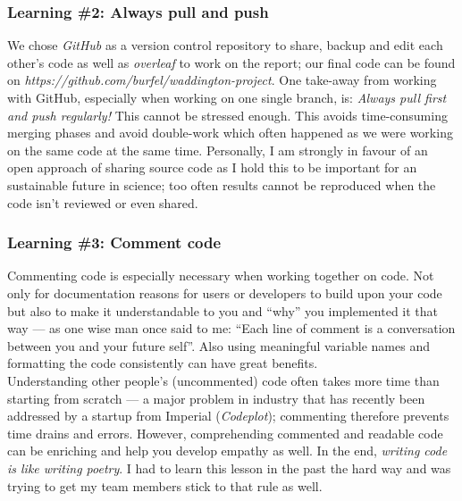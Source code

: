 \documentclass[journal, a4paper]{IEEEtran}
\begin{document}
\subsubsection{Learning \#2: Always pull and push}
We chose \textit{GitHub} as a version control repository to share, backup and edit each other’s code as well as \textit{overleaf} to work on the report; our final code can be found on \textit{https://github.com/burfel/waddington-project}. One take-away from working with GitHub, especially when working on one single branch, is: \textit{Always pull first and push regularly!} This cannot be stressed enough. This avoids time-consuming merging phases and avoid double-work which often happened as we were working on the same code at the same time. 
Personally, I am strongly in favour of an open approach of sharing source code as I hold this to be important for an sustainable future in science; too often results cannot be reproduced when the code isn’t reviewed or even shared.

\hfill
\subsubsection{Learning \#3: Comment code}
Commenting code is especially necessary when working together on code. Not only for documentation reasons for users or developers to build upon your code but also to make it understandable to you and “why” you implemented it that way — as one wise man once said to me: “Each line of comment is a conversation between you and your future self”. Also using meaningful variable names and formatting the code consistently can have great benefits.\\
Understanding other people’s (uncommented) code often takes more time than starting from scratch — a major problem in industry that has recently been addressed by a startup from Imperial (\textit{Codeplot}); commenting therefore prevents time drains and errors. However, comprehending commented and readable code can be enriching and help you develop empathy as well. In the end, \textit{writing code is like writing poetry}. 
I had to learn this lesson in the past the hard way
and was trying to get my team members stick to that rule as well. 


\hfill
\end{document}
